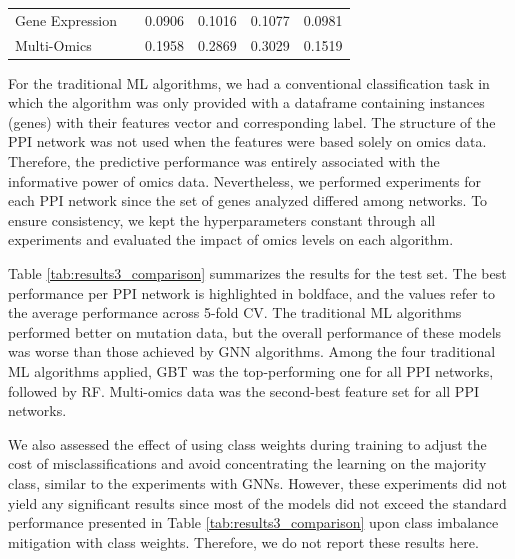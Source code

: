 \begin{table}[!th]
\begin{tabular}{lccccc}
Gene Expression              &                              & 0.0906 & 0.1016                                                   & 0.1077                                                       & 0.0981                                                    \\
Multi-Omics                  &                              & 0.1958 & 0.2869                                                   & 0.3029                                                       & 0.1519                                                    \\ \hline
\end{tabular}
\end{table}

For the traditional ML algorithms, we had a conventional classification task in which the algorithm was only provided with a dataframe containing instances (\ie genes) with their features vector and corresponding label. The structure of the PPI network was not used when the features were based solely on omics data. Therefore, the predictive performance was entirely associated with the informative power of omics data. Nevertheless, we performed experiments for each PPI network since the set of genes analyzed differed among networks. To ensure consistency, we kept the hyperparameters constant through all experiments and evaluated the impact of omics levels on each algorithm.

Table \ref{tab:results3_comparison} summarizes the results for the test set. The best performance per PPI network is highlighted in boldface, and the values refer to the average performance across 5-fold CV. The traditional ML algorithms performed better on mutation data, but the overall performance of these models was worse than those achieved by GNN algorithms. Among the four traditional ML algorithms applied, GBT was the top-performing one for all PPI networks, followed by RF. Multi-omics data was the second-best feature set for all PPI networks.

We also assessed the effect of using class weights during training to adjust the cost of misclassifications and avoid concentrating the learning on the majority class, similar to the experiments with GNNs. However, these experiments did not yield any significant results since most of the models did not exceed the standard performance presented in Table \ref{tab:results3_comparison} upon class imbalance mitigation with class weights. Therefore, we do not report these results here.


